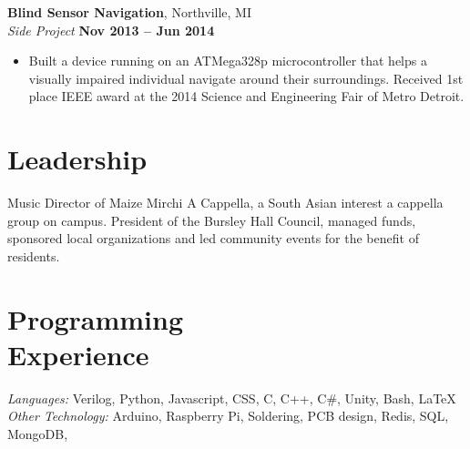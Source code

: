 \documentclass[margin,line]{resume}
\begin{document}
\begin{resume}
    \textbf{Blind Sensor Navigation}, Northville, MI \vspace{2mm}\\\vspace{1mm}%
	\textsl{Side Project} \hfill \textbf{Nov 2013 -- Jun 2014}
	\begin{itemize}
		\item Built a device running on an ATMega328p micro­controller that helps a visually impaired individual navigate around their surroundings. Received 1st place IEEE award at the 2014 Science and Engineering Fair of Metro Detroit. 
	\end{itemize}
	


   \section{\mysidestyle Leadership}
    Music Director of Maize Mirchi A Cappella, a South Asian interest a cappella group on campus. President of the Bursley Hall Council, managed funds, sponsored local organizations and led community events for the benefit of residents. 
\vspace{-2mm}

    \section{\mysidestyle Programming\\Experience}

    \emph{Languages:} Verilog, Python, Javascript, CSS, C,  C++, C\#, Unity, Bash, \LaTeX \\
    \emph{Other Technology:}  Arduino, Raspberry Pi, Soldering, PCB design, Redis, SQL, MongoDB,
\end{resume}
\end{document}

